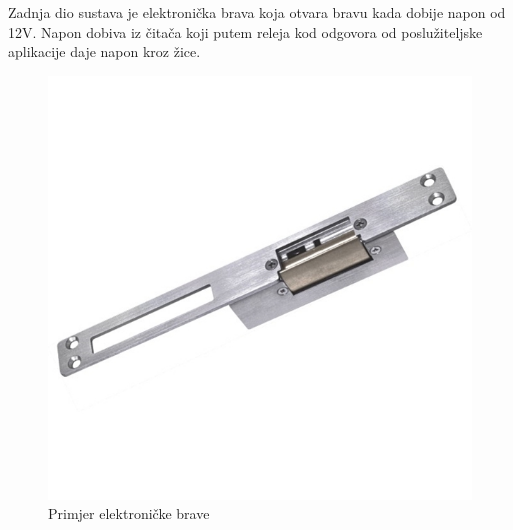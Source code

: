 \documentclass[times, utf8, zavrsni]{fer}
\begin{document}
Zadnja dio sustava je elektronička brava koja otvara bravu kada dobije napon od 12V. Napon dobiva iz čitača koji putem releja kod odgovora od poslužiteljske aplikacije daje napon kroz žice. 
	
\begin{figure}[h]
\includegraphics[scale=1]{brava.jpg}
\centering
\caption{Primjer elektroničke brave \citep{15}}
\centering
\end{figure}
\end{document}
